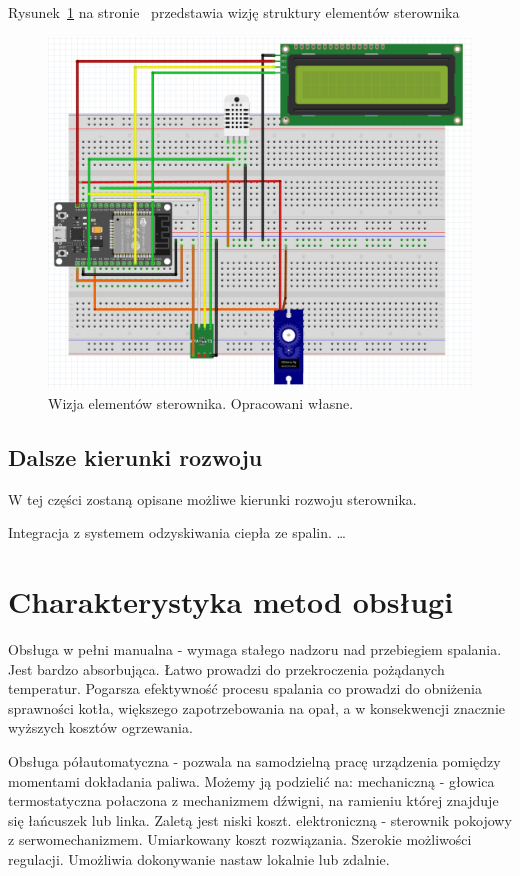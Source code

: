 \documentclass[12pt]{report}
\begin{document}
 Rysunek~\ref{fig:wizja} na stronie~\pageref{fig:wizja} przedstawia wizję struktury elementów sterownika
 \begin{figure}[ht]
\centering
\includegraphics[width=0.8 \textwidth]{fig/fritzing_bredboard_v1.png}
\caption{Wizja elementów sterownika. Opracowani własne.}
\label{fig:wizja}
\end{figure}
 
 \section{Dalsze kierunki rozwoju}
 W tej części zostaną opisane możliwe kierunki rozwoju sterownika.
 
 Integracja z systemem odzyskiwania ciepła ze spalin.
 \ldots
 

 \chapter{Charakterystyka metod obsługi} 
 Obsługa w pełni manualna - wymaga stałego nadzoru nad przebiegiem spalania. Jest bardzo absorbująca. Łatwo prowadzi do przekroczenia pożądanych temperatur. Pogarsza efektywność procesu spalania co prowadzi do obniżenia sprawności kotła, większego zapotrzebowania na opał, a w konsekwencji znacznie wyższych kosztów ogrzewania.
 
 Obsługa półautomatyczna - pozwala na samodzielną pracę urządzenia pomiędzy momentami dokładania paliwa. Możemy ją podzielić na:
 mechaniczną - głowica termostatyczna połaczona z mechanizmem dźwigni, na ramieniu której znajduje się łańcuszek lub linka. Zaletą jest niski koszt.
 elektroniczną - sterownik pokojowy z serwomechanizmem. Umiarkowany koszt rozwiązania. Szerokie możliwości regulacji. Umożliwia dokonywanie nastaw lokalnie lub zdalnie.
 
\end{document}

